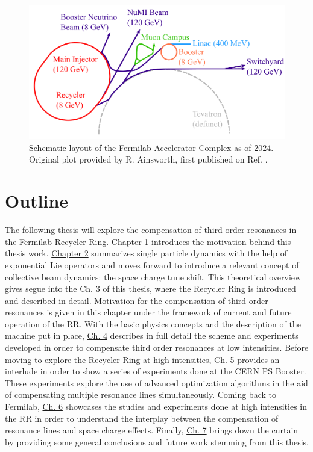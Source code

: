 \begin{figure}[H]
    \centering
    \includegraphics[width=\columnwidth]{chapter1/complex.png}
    \caption{Schematic layout of the Fermilab Accelerator Complex as of 2024. Original plot provided by R. Ainsworth, first published on Ref. \cite{rr1}.}
    \label{fig:fac}
 \end{figure}

\section{Outline}

The following thesis will explore the compensation of third-order resonances in the Fermilab Recycler Ring. \hyperref[sec:ch1]{Chapter 1} introduces the motivation behind this thesis work. \hyperref[sec:ch2]{Chapter 2} summarizes single particle dynamics with the help of exponential Lie operators and moves forward to introduce a relevant concept of collective beam dynamics: the space charge tune shift. This theoretical overview gives segue into the \hyperref[sec:ch3]{Ch. 3} of this thesis, where the Recycler Ring is introduced and described in detail. Motivation for the compensation of third order resonances is given in this chapter under the framework of current and future operation of the RR. With the basic physics concepts and the description of the machine put in place, \hyperref[sec:ch4]{Ch. 4} describes in full detail the scheme and experiments developed in order to compensate third order resonances at low intensities. Before moving to explore the Recycler Ring at high intensities, \hyperref[sec:ch5]{Ch. 5} provides an interlude in order to show a series of experiments done at the CERN PS Booster. These experiments explore the use of advanced optimization algorithms in the aid of compensating multiple resonance lines simultaneously. Coming back to Fermilab, \hyperref[sec:ch6]{Ch. 6} showcases the studies and experiments done at high intensities in the RR in order to understand the interplay between the compensation of resonance lines and space charge effects. Finally, \hyperref[sec:ch7]{Ch. 7} brings down the curtain by providing some general conclusions and future work stemming from this thesis.